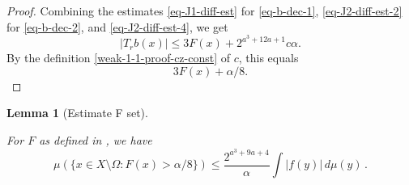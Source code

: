 \documentclass[10pt,a4paper]{article}
\theoremstyle{plain}
\newtheorem{lemma}[theorem]{Lemma}
\theoremstyle{definition}
\numberwithin{equation}{subsection}
\newcommand{\lean}[1]{}
\newcommand{\uses}[1]{}
\newcommand{\leanok}{}
\begin{document}
\begin{proof}
Combining the estimates \eqref{eq-J1-diff-est} for \eqref{eq-b-dec-1}, \eqref{eq-J2-diff-est-2} for \eqref{eq-b-dec-2}, and \eqref{eq-J2-diff-est-4}, we get
\begin{equation*}
    |T_rb(x)|\leq 3F(x)+2^{a^3+12a+1}c\alpha.
\end{equation*}
By the definition \eqref{weak-1-1-proof-cz-const} of $c$, this equals
\begin{equation*}
    3F(x)+\alpha/8.
\end{equation*}
\end{proof}

\begin{lemma}[Estimate F set]
    \label{estimate-F-set}
    \leanok
    \lean{distribution_czOperatorBound}
    \uses{Calderon-Zygmund-decomposition,geometric-series-estimate}
    For $F$ as defined in , we have
    \begin{equation}
        \label{eq-F-X-minus-Omega}
        \mu(\{x\in X\setminus\Omega: F(x)>\alpha/8\}) \le \frac{2^{a^3+9a+4}}{\alpha} \int |f(y)|\,d\mu(y)\,.
    \end{equation}
\end{lemma}
\end{document}
